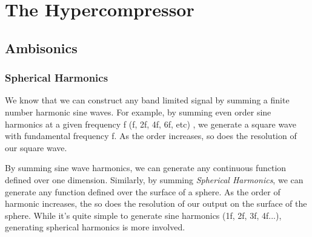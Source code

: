 
\chapter{The Hypercompressor}
\label{ch:hypercompressor}

\section{Ambisonics}
\label{sec:ambisonics}

\subsection{Spherical Harmonics}
\label{sec:spherical-harmonics}

We know that we can construct any band limited signal by summing a
finite number harmonic sine waves. For example, by summing even order sine harmonics
at a given frequency f (f, 2f, 4f, 6f, etc) , we generate a square
wave with fundamental frequency f. As the order increases, so does the
resolution of our square wave.

By summing sine wave harmonics, we can generate any continuous
function defined over one dimension. Similarly, by summing \emph{Spherical
  Harmonics}, we can generate any function defined over the surface of
a sphere. As the order of harmonic increases, the so does the
resolution of our output on the surface of the sphere. While it's
quite simple to generate sine harmonics (1f, 2f, 3f, 4f...),
generating spherical harmonics is more involved.



